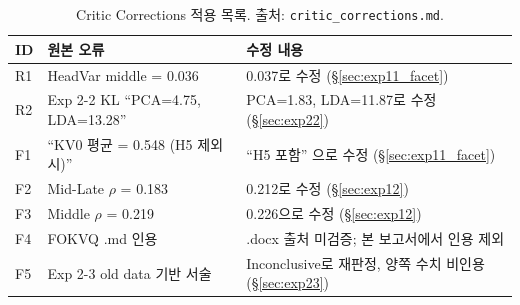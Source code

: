 \documentclass[11pt,a4paper]{article}
\begin{document}
\begin{table}[H]
\centering
\caption{Critic Corrections 적용 목록. 출처: \texttt{critic\_corrections.md}.}
\label{tab:critic}
\small
\begin{tabularx}{\textwidth}{llX}
\toprule
\textbf{ID} & \textbf{원본 오류} & \textbf{수정 내용} \\
\midrule
R1 & HeadVar middle = 0.036 & 0.037로 수정 (\S\ref{sec:exp11_facet}) \\
R2 & Exp 2-2 KL ``PCA=4.75, LDA=13.28'' & PCA=1.83, LDA=11.87로 수정 (\S\ref{sec:exp22}) \\
F1 & ``KV0 평균 = 0.548 (H5 제외 시)'' & ``H5 포함'' 으로 수정 (\S\ref{sec:exp11_facet}) \\
F2 & Mid-Late $\rho$ = 0.183 & 0.212로 수정 (\S\ref{sec:exp12}) \\
F3 & Middle $\rho$ = 0.219 & 0.226으로 수정 (\S\ref{sec:exp12}) \\
F4 & FOKVQ .md 인용 & .docx 출처 미검증; 본 보고서에서 인용 제외 \\
F5 & Exp 2-3 old data 기반 서술 & Inconclusive로 재판정, 양쪽 수치 비인용 (\S\ref{sec:exp23}) \\
\bottomrule
\end{tabularx}
\end{table}
\end{document}
